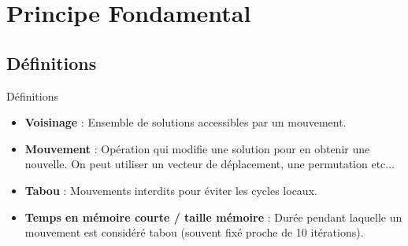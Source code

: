 \documentclass{beamer}
\begin{document}
\section{Principe Fondamental}
\subsection{Définitions}
\begin{frame}{Définitions}
    \begin{itemize}
        \item \textbf{Voisinage} : Ensemble de solutions accessibles par un mouvement.
        \item \textbf{Mouvement} : Opération qui modifie une solution pour en obtenir une nouvelle. On peut utiliser un vecteur de déplacement, une permutation etc...
        \item \textbf{Tabou} : Mouvements interdits pour éviter les cycles locaux.
        \item \textbf{Temps en mémoire courte / taille mémoire} : Durée pendant laquelle un mouvement est considéré tabou (souvent fixé proche de 10 itérations).
    \end{itemize}
\end{frame}
\end{document}
